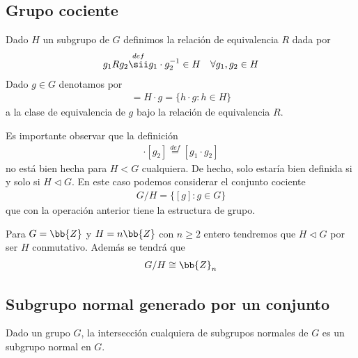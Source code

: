 \subsection{Grupo cociente}

\begin{definicion}
    Dado $H$ un subgrupo de $G$ definimos la relación de equivalencia $R$ dada por 
    \begin{gather*}
        g_1 R g_2 \overset{def}{\sii} g_1\cdot g_2^{-1}\in H\ \ \ \forall g_1,g_2\in H
    \end{gather*}
    Dado $g\in G$ denotamos por 
    \begin{gather*}
        [g]=H\cdot g = \{h\cdot g : h\in H\}
    \end{gather*}
    a la clase de equivalencia de $g$ bajo la relación de equivalencia $R$.
\end{definicion}

\begin{observacion}
    Es importante observar que la definición
    \begin{gather*}
        [g_1] \cdot [g_2] \overset{def}{=} [g_1\cdot g_2]
    \end{gather*}
    no está bien hecha para $H<G$ cualquiera. De hecho, solo estaría bien definida si y solo si $H\lhd G$. En este caso podemos considerar el conjunto cociente 
    \begin{gather*}
        G/H = \{[g] : g\in G\}
    \end{gather*}
    que con la operación anterior tiene la estructura de grupo.
\end{observacion}

\begin{ejemplo}
    Para $G=\bb{Z}$ y $H=n\bb{Z}$ con $n\geq 2$ entero tendremos que $H\lhd G$ por ser $H$ conmutativo. Además se tendrá que 
    \begin{gather*}
        G/H \cong \bb{Z}_n
    \end{gather*}
\end{ejemplo}

\subsection{Subgrupo normal generado por un conjunto}

\begin{observacion}
    Dado un grupo $G$, la intersección cualquiera de subgrupos normales de $G$ es un subgrupo normal en $G$.
\end{observacion}


